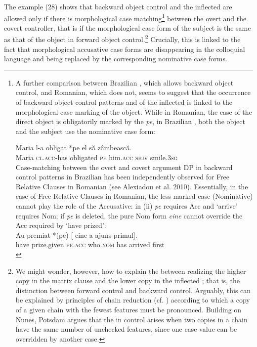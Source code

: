 \documentclass[output=paper]{langsci/langscibook}
\begin{document}
The example (28) shows that backward object control and the inflected  are allowed only if there is morphological case matching\footnote{A further comparison between Brazilian , which allows backward object control, and Romanian, which does not, seems to suggest that the occurrence of backward object control patterns and of the inflected  is linked to the morphological case marking of the object. While in Romanian, the case of the direct object is obligatorily marked by the  \textit{pe}, in Brazilian , both the object and the subject use the nominative case form: 

\ea\gll * Maria  l-a     obligat     *pe el            să      zâmbească.\\
        {} Maria  \textsc{cl.acc}{}-has        obligated     \textsc{pe} him\textsc{.acc} \textsc{sbjv} smile\textsc{{}.3sg}\\
\z
Case-matching between the overt and covert argument DP in backward control patterns in Brazilian  has been independently observed for Free Relative Clauses in Romanian (see Alexiadou et al. 2010). Essentially, in the case of Free Relative Clauses in Romanian, the less marked case (Nominative) cannot play the role of the Accusative: in (ii) \textit{pe} requires Acc and ‘arrive’ requires Nom; if \textit{pe} is deleted, the pure Nom form \textit{cine} cannot override the Acc required by ‘have prized’: 
\ea \citep{Alexiadou2010}\\\gll  Au    premiat       *(pe)     [ cine        a     ajuns    primul].\\
have prize.given   \textsc{pe.acc} {}  who.\textsc{nom} has arrived first\\
\z} between the overt and the covert controller, that is if the morphological case form of the subject is the same as that of the object in forward object control.\footnote{We might wonder, however, how to explain the  between realizing the higher copy in the matrix clause and the lower copy in the inflected ; that is, the distinction between forward control and backward control. Arguably, this  can be explained by principles of chain reduction (cf. \citealt{Nunes2004}) according to which a copy of a given chain with the fewest features must be pronounced. Building on Nunes, Potsdam argues that the  in control arises when two copies in a chain have the same number of unchecked features, since one case value can be overridden by another case.} Crucially, this is linked to the fact that morphological accusative case forms are disappearing in the colloquial language and being replaced by the corresponding nominative case forms.
\end{document}
